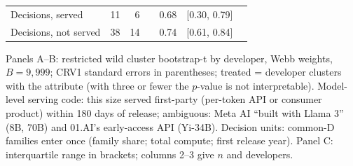 \begin{table}[tp]
\begin{tabular}{@{}lrrrrll@{}}
Decisions, served & 11 & 6 & & 0.68 & {\scriptsize[0.30, 0.79]} & \\
Decisions, not served & 38 & 14 & & 0.74 & {\scriptsize[0.61, 0.84]} & \\
\bottomrule
\end{tabular}
\medskip
\begin{tablenotes}
Panels A--B: restricted wild cluster bootstrap-t by developer, Webb weights, $B=9{,}999$; CRV1 standard errors in parentheses; treated = developer clusters with the attribute (with three or fewer the $p$-value is not interpretable). Model-level serving code: this size served first-party (per-token API or consumer product) within 180 days of release; ambiguous: Meta AI ``built with Llama 3'' (8B, 70B) and 01.AI's early-access API (Yi-34B). Decision units: common-D families enter once (family share; total compute; first release year). Panel C: interquartile range in brackets; columns 2--3 give $n$ and developers.
\end{tablenotes}
\end{table}

